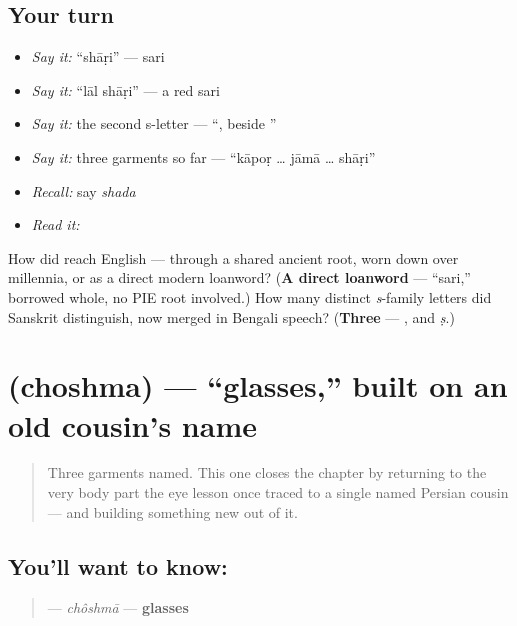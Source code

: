 \subsection*{Your turn}
\begin{itemize}
\raggedright
  \item \emph{Say it:} \textquotedblleft{}shāṛi\textquotedblright{} — sari
  \item \emph{Say it:} \textquotedblleft{}lāl shāṛi\textquotedblright{} — a red sari
  \item \emph{Say it:} the second s-letter — \textquotedblleft{}, beside \textquotedblright{}
  \item \emph{Say it:} three garments so far — \textquotedblleft{}kāpoṛ … jāmā … shāṛi\textquotedblright{}
  \item \emph{Recall:} say \emph{shada}
  \item \emph{Read it:} \textbf{}
\end{itemize}

\begin{tcolorbox}[breakable,colback=teal!4,colframe=teal!35!black,title={Before you move on}]
How did  reach English — through a shared ancient root, worn down over millennia, or as a direct modern loanword? (\textbf{A direct loanword} — \textquotedblleft{}sari,\textquotedblright{} borrowed whole, no PIE root involved.) How many distinct \emph{s}-family letters did Sanskrit distinguish, now merged in Bengali speech? (\textbf{Three} — ,  and \emph{ṣ}.)
\end{tcolorbox}
\section[\texorpdfstring{\bn{চশমা} (choshma)}{চশমা (choshma)}]{ (choshma) — \textquotedblleft{}glasses,\textquotedblright{} built on an old cousin's name}

\label{lesson:BN-C15-choshma}



\begin{quote}
Three garments named. This one closes the chapter by returning to the very body part the eye lesson once traced to a single named Persian cousin — and building something new out of it.
\end{quote}

\subsection*{You'll want to know: }
\begin{quote}
\textbf{} — \emph{chôshmā} — \textbf{glasses}
\end{quote}


